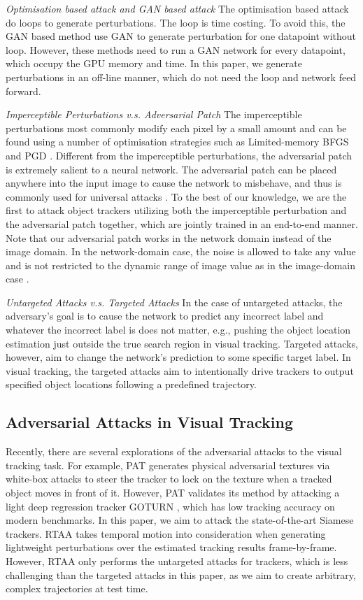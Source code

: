\documentclass[journal]{IEEEtran}
\newcommand{\eg}{e.g.}
\begin{document}
\textit{Optimisation based attack and GAN based attack} The optimisation based attack do loops to generate perturbations. The loop is time costing. To avoid this, the GAN based method use GAN to generate perturbation for one datapoint without loop. However, these methods need to run a GAN network for every datapoint, which occupy the GPU memory and time. In this paper, we generate perturbations in an off-line manner, which do not need the loop and network feed forward.

\textit{Imperceptible Perturbations v.s. Adversarial Patch} The imperceptible perturbations most commonly modify each pixel by a small amount and can be found using a number of optimisation strategies such as Limited-memory BFGS \cite{intriguing} and PGD \cite{PGD}.
Different from the imperceptible perturbations, the adversarial patch is extremely salient to a neural network. The adversarial patch can be placed anywhere into the input image to cause the network to misbehave, and thus is commonly used for universal attacks \cite{patch}.
To the best of our knowledge, we are the first to attack object trackers utilizing both the imperceptible perturbation and the adversarial patch together, which are jointly trained in an end-to-end manner.
Note that our adversarial patch works in the network domain instead of the image domain. In the network-domain case, the noise is allowed to take any value and is not restricted to the dynamic range of image value as in the image-domain case \cite{karmon2018lavan}.

\textit{Untargeted Attacks v.s. Targeted Attacks} In the case of untargeted attacks, the adversary's goal is to cause the network to predict any incorrect label and whatever the incorrect label is does not matter, \eg, pushing the object location estimation just outside the true search region in visual tracking.
Targeted attacks, however, aim to change the network's prediction to some specific target label. In visual tracking, the targeted attacks aim to intentionally drive trackers to output specified object locations following a predefined trajectory.

\subsection{Adversarial Attacks in Visual Tracking}

Recently, there are several explorations of the adversarial attacks to the visual tracking task. For example, PAT \cite{PAT} generates physical adversarial textures via white-box attacks to steer the tracker to lock on the texture when a tracked object moves in front of it. However, PAT validates its method by attacking a light deep regression tracker GOTURN \cite{GOTURN}, which has low tracking accuracy on modern benchmarks. In this paper, we aim to attack the state-of-the-art Siamese trackers.
RTAA \cite{RTAA} takes temporal motion into consideration when generating lightweight perturbations over the estimated tracking results frame-by-frame. However, RTAA only performs the untargeted attacks for trackers, which is less challenging than the targeted attacks in this paper, as we aim to create arbitrary, complex trajectories at test time. 
\end{document}
